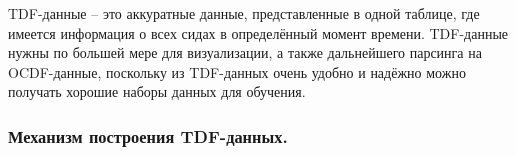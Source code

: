 {\standartFont

  \par TDF-данные {--} это аккуратные данные, представленные в одной таблице, где имеется информация о всех сидах в определённый момент времени. TDF-данные нужны по большей мере для визуализации, а также дальнейшего парсинга на OCDF-данные, поскольку из TDF-данных очень удобно и надёжно можно получать хорошие наборы данных для обучения.

  \par
}

\subsubsection{ \standartTitleFont
  Механизм построения TDF-данных.
} \label{subsubsec:CreateTDFHow}

